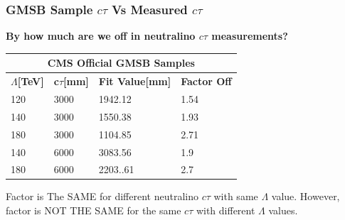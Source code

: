 \documentclass{beamer}
\begin{document}
\begin{frame}
\frametitle{GMSB Sample $c\tau$ Vs Measured $c\tau$}
\begin{LARGE}
\textbf{By how much are we off in neutralino $c\tau$ measurements?}
\end{LARGE}
\begin{table}
\begin{minipage}[b]{1.0\linewidth}
\centering
\begin{tabular}{|l||l||l||l|}
\hline
\multicolumn{4}{|c|}{\bfseries{CMS Official GMSB Samples}} \\
\hline
\bfseries{$\Lambda$[TeV]} & \bfseries{c$\tau$[mm]} & \bfseries{Fit Value[mm]} &\bfseries{Factor Off} \\
\hline
120 & 3000 & 1942.12 & 1.54 \\
140 & 3000 & 1550.38 & 1.93 \\
180 & 3000 & 1104.85 & 2.71 \\
\hline
\hline
140 & 6000 & 3083.56 & 1.9 \\
180 & 6000 & 2203..61 & 2.7 \\
\hline
\end{tabular}
\end{minipage}
\end{table}
\vspace{-0.5cm}
Factor is \alert{The SAME} for different neutralino $c\tau$ with same $\Lambda$ value. However, factor is \alert{NOT THE SAME} for the same $c\tau$ with different $\Lambda$ values.
\end{frame}
\end{document}
